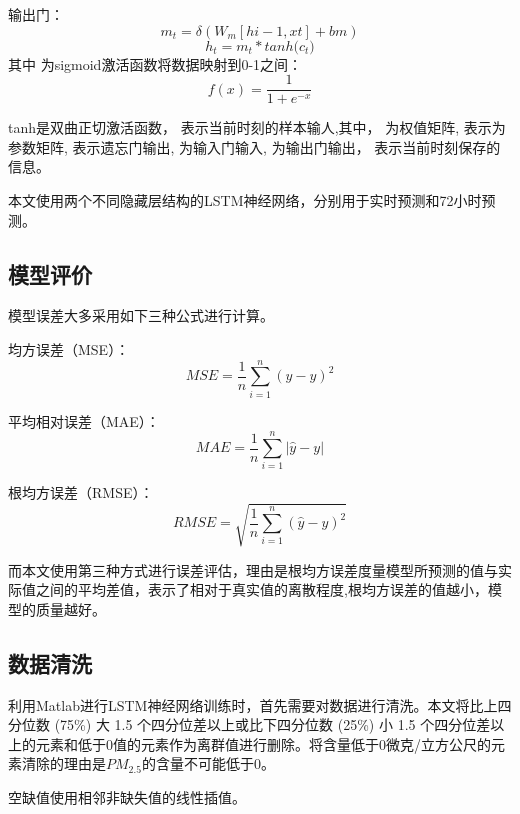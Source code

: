 \documentclass[UTF8]{ctexart}
\begin{document}
输出门：
\begin{equation}
    m_t=\delta(W_m[hi-1,xt]+bm)
\end{equation}
\begin{equation}
    h_t=m_t*tanh{(}c_t)
\end{equation}
其中 为sigmoid激活函数将数据映射到0-1之间：
\begin{equation}
    f(x)=\frac{1}{1+e^{-x}}
\end{equation}

tanh是双曲正切激活函数， 表示当前时刻的样本输人,其中， 为权值矩阵, 表示为参数矩阵,  表示遗忘门输出,  为输入门输入,  为输出门输出， 表示当前时刻保存的信息。

本文使用两个不同隐藏层结构的LSTM神经网络，分别用于实时预测和72小时预测。

\subsection{模型评价}
模型误差大多采用如下三种公式进行计算。

均方误差（MSE）：
\begin{equation}
    MSE=\frac{1}{n}\sum_{i=1}^{n}{(\hat{y}-y)^2}
\end{equation}

平均相对误差（MAE）：
\begin{equation}
    MAE=\frac{1}{n}\sum_{i=1}^{n}\left|\hat{y}-y\right|
\end{equation}

根均方误差（RMSE）：
\begin{equation}
    RMSE=\sqrt{\frac{1}{n}\sum_{i=1}^{n}{(\hat{y}-y)^2}}
\end{equation}

而本文使用第三种方式进行误差评估，理由是根均方误差度量模型所预测的值与实际值之间的平均差值，表示了相对于真实值的离散程度,根均方误差的值越小，模型的质量越好。
\subsection{数据清洗}
利用Matlab进行LSTM神经网络训练时，首先需要对数据进行清洗。本文将比上四分位数 (75\%) 大 1.5 个四分位差以上或比下四分位数 (25\%) 小 1.5 个四分位差以上的元素和低于0值的元素作为离群值进行删除。将含量低于0微克/立方公尺的元素清除的理由是$PM_{2.5}$的含量不可能低于0。

空缺值使用相邻非缺失值的线性插值。
\end{document}

